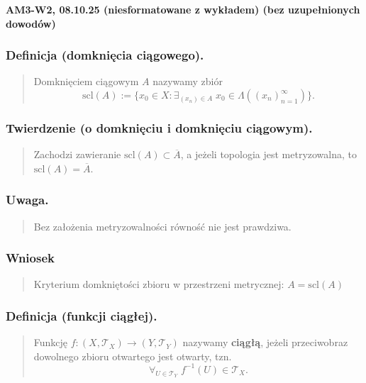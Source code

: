 \documentclass[10pt,a4paper]{article}
\newcommand{\zagadnienie}[3]{%
    \clearpage %
    \noindent\textbf{#1} #2\\
    #3
}
\begin{document}
\zagadnienie{AM3-W2, 08.10.25 (niesformatowane z wykładem) (bez uzupełnionych dowodów)}{}
{
    \subsubsection*{Definicja (domknięcia ciągowego).}
    \begin{quote}
    Domknięciem ciągowym $A$ nazywamy zbiór \\
    $$\mathrm{scl}(A) := \{x_0 \in X: \exists_{(x_n) \in A} \; x_0 \in \Lambda((x_n)_{n=1}^{\infty})\}.$$
    \end{quote}

    \subsubsection*{Twierdzenie (o domknięciu i domknięciu ciągowym).}
    \begin{quote}
    Zachodzi zawieranie $\mathrm{scl}(A) \subset \overline{A}$, a jeżeli topologia jest metryzowalna, to $\mathrm{scl}(A) = \overline{A}$.
    \end{quote}

    \subsubsection*{Uwaga.}
    \begin{quote}
    Bez założenia metryzowalności równość nie jest prawdziwa.
    \end{quote}

    \subsubsection*{Wniosek}
    \begin{quote}
    Kryterium domkniętości zbioru w przestrzeni metrycznej: $A = \mathrm{scl}(A)$
    \end{quote}

    \subsubsection*{Definicja (funkcji ciągłej).}
    \begin{quote}
    Funkcję $f : (X, \mathcal{T}_X) \to (Y, \mathcal{T}_Y)$ nazywamy \textbf{ciągłą}, jeżeli przeciwobraz dowolnego zbioru otwartego jest otwarty, tzn. \\
    $$\forall_{U \in \mathcal{T}_Y} \; f^{-1}(U) \in \mathcal{T}_X.$$
    \end{quote}

}
\end{document}
